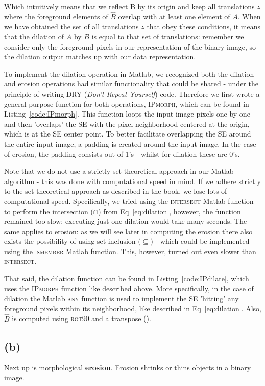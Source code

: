 \documentclass{article}
\begin{document}
Which intuitively means that we reflect B by its origin and keep all translations $z$ where the foreground elements of $\hat{B}$ overlap with at least one element of $A$. When we have obtained the set of all translations $z$ that obey these conditions, it means that the dilation of $A$ by $B$ is equal to that set of translations: remember we consider only the foreground pixels in our representation of the binary image, so the dilation output matches up with our data representation.

To implement the dilation operation in Matlab, we recognized both the dilation and erosion operations had similar functionality that could be shared - under the principle of writing DRY (\textit{Don't Repeat Yourself}) code. Therefore we first wrote a general-purpose function for both operations, \textsc{IPmorph}, which can be found in  Listing~\ref{code:IPmorph}. This function loops the input image pixels one-by-one and then 'overlaps' the SE with the pixel neighborhood centered at the origin, which is at the SE center point. To better facilitate overlapping the SE around the entire input image, a padding is created around the input image. In the case of erosion, the padding consists out of 1's - whilst for dilation these are 0's.

Note that we do not use a strictly set-theoretical approach in our Matlab algorithm - this was done with computational speed in mind. If we adhere strictly to the set-theoretical approach as described in the book, we lose lots of computational speed. Specifically, we tried using the \textsc{intersect} Matlab function to perform the intersection ($\cap$) from Eq~\ref{eq:dilation}, however, the function remained too slow: executing just one dilation would take many seconds. The same applies to erosion: as we will see later in computing the erosion there also exists the possibility of using set inclusion ($\subseteq$) - which could be implemented using the \textsc{ismember} Matlab function. This, however, turned out even slower than \textsc{intersect}.

That said, the dilation function can be found in  Listing~\ref{code:IPdilate}, which uses the \textsc{IPmorph} function like described above. More specifically, in the case of dilation the Matlab \textsc{any} function is used to implement the SE 'hitting' any foreground pixels within its neighborhood, like described in Eq~\ref{eq:dilation}. Also, $\hat{B}$ is computed using \textsc{rot90} and a transpose (\').

\subsection*{(b)}
Next up is morphological \textbf{erosion}. Erosion shrinks or thins objects in a binary image.
\end{document}
